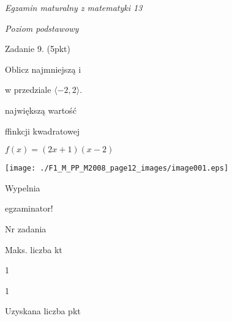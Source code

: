 \documentclass[a4paper,12pt]{article}
\begin{document}
{\it Egzamin maturalny z matematyki 13}

{\it Poziom podstawowy}

Zadanie 9. (5pkt)

Oblicz najmniejszą i

w przedziale $\langle-2, 2\rangle.$

największą wartość

ffinkcji kwadratowej

$f(x)=(2x+1)(x-2)$
\begin{center}
\texttt{[image: ./F1\_M\_PP\_M2008\_page12\_images/image001.eps]}
\end{center}
Wypelnia

egzaminator!

Nr zadania

Maks. liczba kt

1

1

Uzyskana liczba pkt
\end{document}
